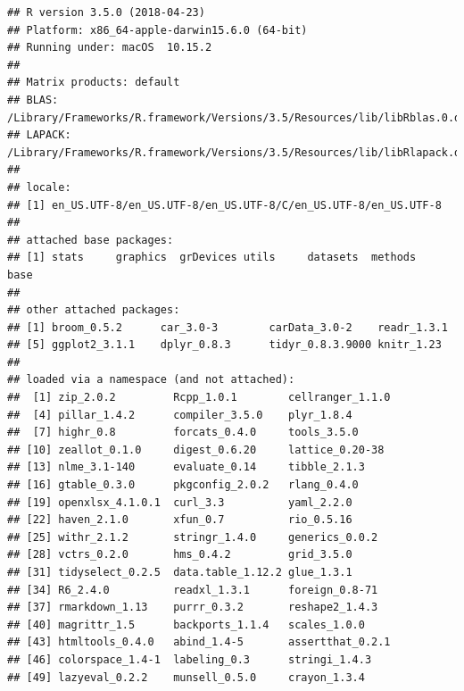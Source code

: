 \documentclass[]{article}
\begin{document}
\begin{verbatim}
## R version 3.5.0 (2018-04-23)
## Platform: x86_64-apple-darwin15.6.0 (64-bit)
## Running under: macOS  10.15.2
## 
## Matrix products: default
## BLAS: /Library/Frameworks/R.framework/Versions/3.5/Resources/lib/libRblas.0.dylib
## LAPACK: /Library/Frameworks/R.framework/Versions/3.5/Resources/lib/libRlapack.dylib
## 
## locale:
## [1] en_US.UTF-8/en_US.UTF-8/en_US.UTF-8/C/en_US.UTF-8/en_US.UTF-8
## 
## attached base packages:
## [1] stats     graphics  grDevices utils     datasets  methods   base     
## 
## other attached packages:
## [1] broom_0.5.2      car_3.0-3        carData_3.0-2    readr_1.3.1     
## [5] ggplot2_3.1.1    dplyr_0.8.3      tidyr_0.8.3.9000 knitr_1.23      
## 
## loaded via a namespace (and not attached):
##  [1] zip_2.0.2         Rcpp_1.0.1        cellranger_1.1.0 
##  [4] pillar_1.4.2      compiler_3.5.0    plyr_1.8.4       
##  [7] highr_0.8         forcats_0.4.0     tools_3.5.0      
## [10] zeallot_0.1.0     digest_0.6.20     lattice_0.20-38  
## [13] nlme_3.1-140      evaluate_0.14     tibble_2.1.3     
## [16] gtable_0.3.0      pkgconfig_2.0.2   rlang_0.4.0      
## [19] openxlsx_4.1.0.1  curl_3.3          yaml_2.2.0       
## [22] haven_2.1.0       xfun_0.7          rio_0.5.16       
## [25] withr_2.1.2       stringr_1.4.0     generics_0.0.2   
## [28] vctrs_0.2.0       hms_0.4.2         grid_3.5.0       
## [31] tidyselect_0.2.5  data.table_1.12.2 glue_1.3.1       
## [34] R6_2.4.0          readxl_1.3.1      foreign_0.8-71   
## [37] rmarkdown_1.13    purrr_0.3.2       reshape2_1.4.3   
## [40] magrittr_1.5      backports_1.1.4   scales_1.0.0     
## [43] htmltools_0.4.0   abind_1.4-5       assertthat_0.2.1 
## [46] colorspace_1.4-1  labeling_0.3      stringi_1.4.3    
## [49] lazyeval_0.2.2    munsell_0.5.0     crayon_1.3.4
\end{verbatim}
\end{document}
